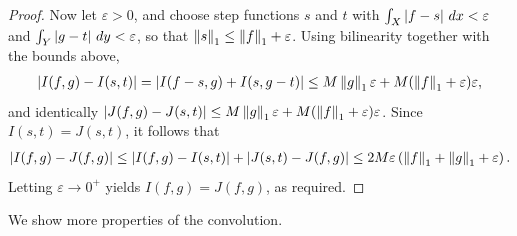 \begin{proof}
    Now let $\varepsilon > 0$, and choose step functions $s$ and $t$ with $\int_{X} \left| f-s \right| \, dx < \varepsilon$ and $\int_{Y} \left| g-t \right| \, dy < \varepsilon$, so that $\left\lVert s\right\rVert_{1} \leq \left\lVert f\right\rVert_{1} + \varepsilon$. Using bilinearity together with the bounds above,
    \begin{align}
        \left| I(f,g)-I(s,t) \right| = \left| I(f-s,g) + I(s,g-t) \right| \leq M\left\lVert g\right\rVert_{1}\varepsilon + M(\left\lVert f\right\rVert_{1}+\varepsilon)\varepsilon,
    \end{align}
    and identically $\left| J(f,g)-J(s,t) \right| \leq M\left\lVert g\right\rVert_{1}\varepsilon + M(\left\lVert f\right\rVert_{1}+\varepsilon)\varepsilon$. Since $I(s,t) = J(s,t)$, it follows that
    \begin{align}
        \left| I(f,g)-J(f,g) \right| \leq \left| I(f,g)-I(s,t) \right| + \left| J(s,t)-J(f,g) \right| \leq 2M\varepsilon\left(\left\lVert f\right\rVert_{1}+\left\lVert g\right\rVert_{1}+\varepsilon\right).
    \end{align}
    Letting $\varepsilon \to 0^{+}$ yields $I(f,g) = J(f,g)$, as required.
\end{proof}

We show more properties of the convolution.

